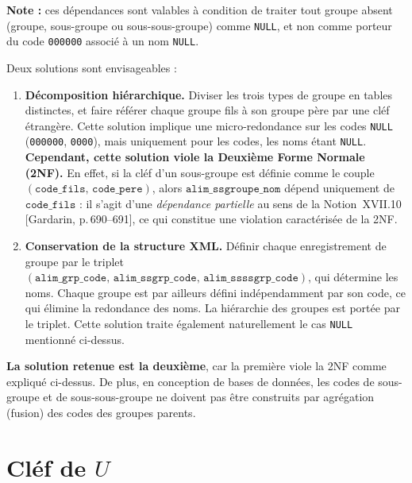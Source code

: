 \documentclass[12pt, a4paper]{article}
\newcommand{\attr}[1]{\texttt{#1}}
\newcommand{\citeg}[1]{\textnormal{\footnotesize[#1]}}
\begin{document}
    \textbf{Note :} ces dépendances sont valables à condition de traiter tout groupe absent (groupe,
    sous-groupe ou sous-sous-groupe) comme \texttt{NULL}, et non comme porteur du code \texttt{000000}
    associé à un nom \texttt{NULL}.

    Deux solutions sont envisageables :

    \begin{enumerate}
        \item \textbf{Décomposition hiérarchique.} Diviser les trois types de groupe en tables distinctes,
        et faire référer chaque groupe fils à son groupe père par une cléf étrangère. Cette solution
        implique une micro-redondance sur les codes \texttt{NULL} (\texttt{000000}, \texttt{0000}),
        mais uniquement pour les codes, les noms étant \texttt{NULL}.\\[0.3em]
        \textbf{Cependant, cette solution viole la Deuxième Forme Normale (2NF).}
        En effet, si la cléf d'un sous-groupe est définie comme le couple
        $(\attr{code\_fils},\, \attr{code\_pere})$, alors $\attr{alim\_ssgroupe\_nom}$ dépend
        uniquement de $\attr{code\_fils}$ : il s'agit d'une \emph{dépendance partielle} au sens de
        la Notion~XVII.10 \hspace{0.2em}\citeg{Gardarin, p.\,690--691}, ce qui constitue une
        violation caractérisée de la 2NF.

        \item \textbf{Conservation de la structure XML.} Définir chaque enregistrement de groupe par le
        triplet $(\attr{alim\_grp\_code},\, \attr{alim\_ssgrp\_code},\, \attr{alim\_ssssgrp\_code})$,
        qui détermine les noms. Chaque groupe est par ailleurs défini indépendamment par son code,
        ce qui élimine la redondance des noms. La hiérarchie des groupes est portée par le triplet.
        Cette solution traite également naturellement le cas \texttt{NULL} mentionné ci-dessus.
    \end{enumerate}

    \textbf{La solution retenue est la deuxième}, car la première viole la 2NF comme expliqué ci-dessus.
    De plus, en conception de bases de données, les codes de sous-groupe et de sous-sous-groupe ne doivent
    pas être construits par agrégation (fusion) des codes des groupes parents.



    \section{Cléf de \texorpdfstring{$U$}{U}}
\end{document}

